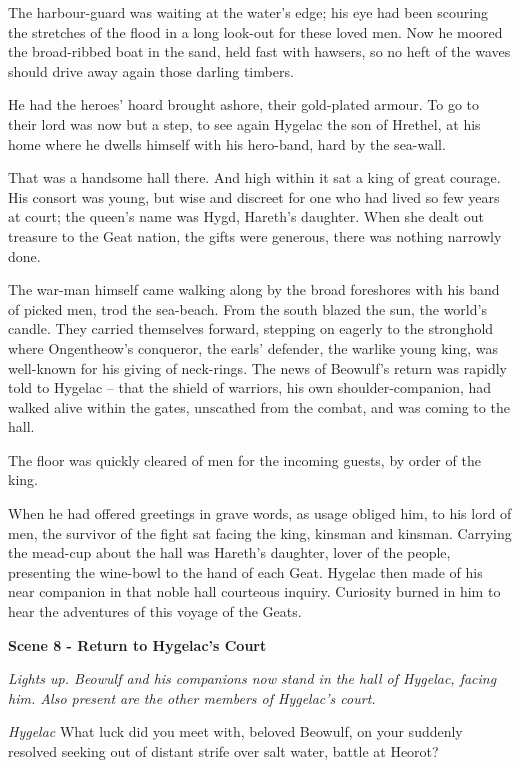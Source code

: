 \documentclass[a4paper]{article}
\begin{document}
{The harbour-guard was waiting at the water’s edge;
his eye had been scouring the stretches of the flood
in a long look-out for these loved men.
Now he moored the broad-ribbed boat in the sand,
held fast with hawsers, so no heft of the waves
should drive away again those darling timbers.

He had the heroes’ hoard brought ashore,
their gold-plated armour. To go to their lord
was now but a step, to see again Hygelac
the son of Hrethel, at his home where he dwells
himself with his hero-band, hard by the sea-wall.

That was a handsome hall there. And high within it sat
a king of great courage. His consort was young,
but wise and discreet for one who had lived
so few years at court; the queen’s name was Hygd,
Hareth’s daughter. When she dealt out treasure
to the Geat nation, the gifts were generous,
there was nothing narrowly done.

The war-man himself came walking along
by the broad foreshores with his band of picked men,
trod the sea-beach. From the south blazed
the sun, the world’s candle. They carried themselves forward,
stepping on eagerly to the stronghold where
Ongentheow’s conqueror, the earls’ defender,
the warlike young king, was well-known for his
giving of neck-rings. The news of Beowulf’s
return was rapidly told to Hygelac
– that the shield of warriors, his own shoulder-companion,
had walked alive within the gates,
unscathed from the combat, and was coming to the hall.

The floor was quickly cleared of men
for the incoming guests, by order of the king.

When he had offered greetings in grave words,
as usage obliged him, to his lord of men,
the survivor of the fight sat facing the king,
kinsman and kinsman. Carrying the mead-cup
about the hall was Hareth’s daughter,
lover of the people, presenting the wine-bowl
to the hand of each Geat. Hygelac then made
of his near companion in that noble hall
courteous inquiry. Curiosity burned in him
to hear the adventures of this voyage of the Geats.

\centerline{\textbf{Scene 8 - Return to Hygelac's Court}}
\centerline{\textit{Lights up. Beowulf and his companions now stand in the hall of Hygelac, facing him. Also present are the other members of Hygelac's court.}}

\textit{Hygelac} What luck did you meet with, beloved Beowulf,
on your suddenly resolved seeking out
of distant strife over salt water,
battle at Heorot? 

}
\end{document}
